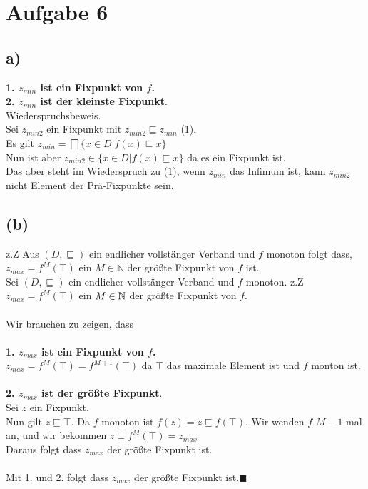 \section*{Aufgabe 6}

\subsection*{a)}
\textbf{1. $z_{min}$ ist ein Fixpunkt von $f$.}\\

\textbf{2. $z_{min}$ ist der kleinste Fixpunkt}.\\
Wiederspruchsbeweis.\\
Sei $z_{min2}$ ein Fixpunkt mit $z_{min2} \sqsubseteq z_{min}$ (1).\\
Es gilt $z_{min} = \bigsqcap \{x \in D | f(x) \sqsubseteq x \}$\\
Nun ist aber $z_{min2} \in \{x \in D | f(x) \sqsubseteq x \}$ da es ein Fixpunkt ist.\\
Das aber steht im Wiederspruch zu (1), wenn $z_{min}$ das Infimum ist, kann $z_{min2}$ nicht Element der Prä-Fixpunkte sein.
 
\subsection*{(b)}
z.Z Aus $(D,\sqsubseteq)$ ein endlicher vollstänger Verband und $f$ monoton folgt dass, $z_{max} = f^M(\top)$ ein $M \in \mathbb{N}$ der größte Fixpunkt von $f$ ist.\\
Sei $(D,\sqsubseteq)$ ein endlicher vollstänger Verband und $f$ monoton.
z.Z $z_{max} = f^M(\top)$ ein $M \in \mathbb{N}$ der größte Fixpunkt von $f$.\\\\
Wir brauchen zu zeigen, dass\\\\
\textbf{1. $z_{max}$ ist ein Fixpunkt von $f$.}\\
$z_{max} = f^M(\top) = f^{M+1}(\top)$ da $\top$ das maximale Element ist und $f$ monton ist.\\\\
\textbf{2. $z_{max}$ ist der größte Fixpunkt}.\\
Sei $z$ ein Fixpunkt.\\
Nun gilt $z \sqsubseteq \top$. Da $f$ monoton ist
$f(z) = z  \sqsubseteq f(\top)$. Wir wenden $f$ $M-1$ mal an, und wir bekommen $z  \sqsubseteq f^M(\top) = z_{max} $\\
Daraus folgt dass $ z_{max}$ der größte Fixpunkt ist.\\\\
Mit 1. und 2. folgt dass $z_{max}$ der größte Fixpunkt ist.$\blacksquare$




